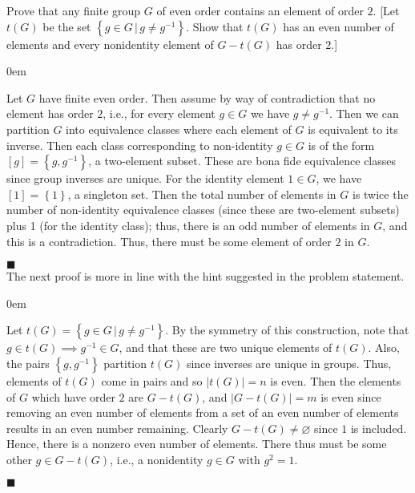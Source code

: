 \documentclass[12pt]{article}
\renewcommand{\qed}{\hfill$\blacksquare$}
\renewenvironment{proof}{\begin{addmargin}[1em]{0em}\begin{newproof}}{\end{newproof}\end{addmargin}\qed}
\newenvironment{problem}[2][Exercise]{\begin{trivlist}
\item[\hskip \labelsep {\bfseries #1}\hskip \labelsep {\bfseries #2.}]}{\end{trivlist}}
\begin{document}
\begin{problem}{1.1.31}
Prove that any finite group $G$ of even order contains an element of order $2$. [Let $t\left(G\right)$ be the set $\left\{g\in G\, | \, g\neq g^{-1} \right\}$. Show that $t\left(G\right)$ has an even number of elements and every nonidentity element of $G-t\left(G\right)$ has order $2$.]
\end{problem}
\begin{proof}
Let $G$ have finite even order. Then assume by way of contradiction that no element has order $2$, i.e., for every element $g\in G$ we have $g\neq g^{-1}$. Then we can partition $G$ into equivalence classes where each element of $G$ is equivalent to its inverse. Then each class corresponding to non-identity $g\in G$ is of the form $\left[g\right] = \left\{g,g^{-1}\right\}$, a two-element subset. These are bona fide equivalence classes since group inverses are unique. For the identity element $1\in G$, we have $\left[1\right] = \left\{1\right\}$, a singleton set. Then the total number of elements in $G$ is twice the number of non-identity equivalence classes (since these are two-element subsets) plus 1 (for the identity class); thus, there is an odd number of elements in $G$, and this is a contradiction. Thus, there must be some element of order $2$ in $G$.
\end{proof}\\
The next proof is more in line with the hint suggested in the problem statement.\\
\begin{proof}
Let $t\left(G\right) = \left\{ g\in G \, | \, g\neq g^{-1}\right\}$. By the symmetry of this construction, note that $g\in t\left(G\right) \implies g^{-1}\in G$, and that these are two unique elements of $t\left(G\right)$. Also, the pairs $\left\{g,g^{-1}\right\}$ partition $t\left(G\right)$ since inverses are unique in groups. Thus, elements of $t\left(G\right)$ come in pairs and so $\left|t\left(G\right)\right|=n$ is even. Then the elements of $G$ which have order $2$ are $G-t\left(G\right)$, and $\left|G-t\left(G\right)\right|=m$ is even since removing an even number of elements from a set of an even number of elements results in an even number remaining. Clearly $G-t\left(G\right) \neq \varnothing $ since $1$ is included. Hence, there is a nonzero even number of elements. There thus must be some other $g\in G-t\left(G\right)$, i.e., a nonidentity $g\in G$ with $g^2=1$.
\end{proof}
\end{document}
